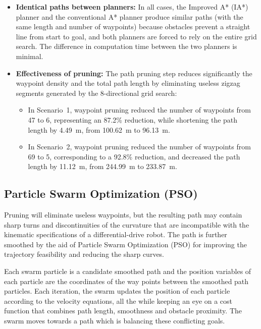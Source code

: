 \begin{itemize}[noitemsep]
\item \textbf{Identical paths between planners:} In all cases, the Improved A* (IA*) planner and the conventional A* planner produce similar paths (with the same length and number of waypoints) because obstacles prevent a straight line from start to goal, and both planners are forced to rely on the entire grid search. The difference in computation time between the two planners is minimal.
\item \textbf{Effectiveness of pruning:} The path pruning step reduces significantly the waypoint density and the total path length by eliminating useless zigzag segments generated by the 8-directional grid search:

\begin{itemize}[noitemsep]
	\item In Scenario~1, waypoint pruning reduced the number of waypoints from 47 to 6, representing an 87.2\% reduction, while shortening the path length by 4.49~m, from 100.62~m to 96.13~m.
	
	\item In Scenario~2, waypoint pruning reduced the number of waypoints from 69 to 5, corresponding to a 92.8\% reduction, and decreased the path length by 11.12~m, from 244.99~m to 233.87~m.
\end{itemize}	
\end{itemize}

\subsection{Particle Swarm Optimization (PSO)}
\label{subsec:pso_overview}
Pruning will eliminate useless waypoints, but the resulting path may contain sharp turns and discontinuities of the curvature that are incompatible with the kinematic specifications of a differential-drive robot. The path is further smoothed by the aid of Particle Swarm Optimization (PSO) for improving the trajectory feasibility and reducing the sharp curves.

Each swarm particle is a candidate smoothed path and the position variables of each particle are the coordinates of the way points between the smoothed path particles. Each iteration, the swarm updates the position of each particle according to the velocity equations, all the while keeping an eye on a cost function that combines path length, smoothness and obstacle proximity. The swarm moves towards a path which is balancing these conflicting goals.

